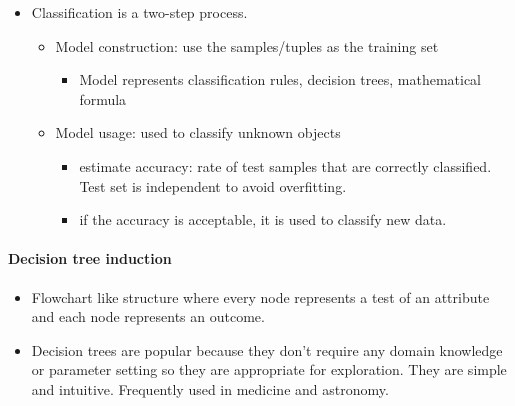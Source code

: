 \documentclass[11pt]{article}
\providecommand{\tightlist}{%
      \setlength{\itemsep}{0pt}\setlength{\parskip}{0pt}}
\begin{document}
    \begin{itemize}
\tightlist
\item
  Classification is a two-step process.

  \begin{itemize}
  \tightlist
  \item
    Model construction: use the samples/tuples as the training set

    \begin{itemize}
    \tightlist
    \item
      Model represents classification rules, decision trees,
      mathematical formula
    \end{itemize}
  \item
    Model usage: used to classify unknown objects

    \begin{itemize}
    \tightlist
    \item
      estimate accuracy: rate of test samples that are correctly
      classified. Test set is independent to avoid overfitting.
    \item
      if the accuracy is acceptable, it is used to classify new data.
    \end{itemize}
  \end{itemize}
\end{itemize}

    \paragraph{Decision tree induction}\label{decision-tree-induction}

    \begin{itemize}
\tightlist
\item
  Flowchart like structure where every node represents a test of an
  attribute and each node represents an outcome.
\item
  Decision trees are popular because they don't require any domain
  knowledge or parameter setting so they are appropriate for
  exploration. They are simple and intuitive. Frequently used in
  medicine and astronomy.
\end{itemize}
\end{document}
